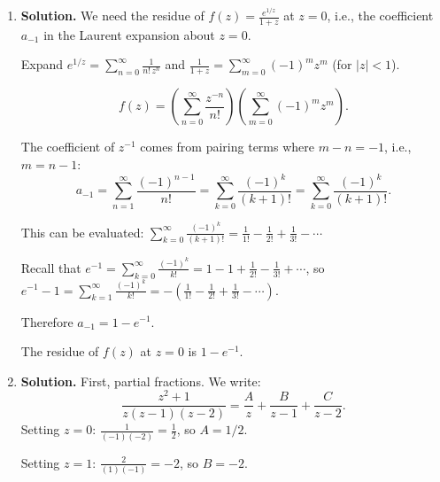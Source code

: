 \begin{enumerate}
For the region $0 < |z| < 2$, expand $\frac{1}{z-2} = \frac{-1}{2}\cdot\frac{1}{1 - z/2}$ as a geometric series (valid for $|z| < 2$):
\[
\frac{1}{z-2} = -\frac{1}{2}\sum_{n=0}^{\infty}\frac{z^n}{2^n} = -\sum_{n=0}^{\infty}\frac{z^n}{2^{n+1}}.
\]
Therefore:
\[
f(z) = -\frac{1}{2z} + \frac{1}{2}\left(-\sum_{n=0}^{\infty}\frac{z^n}{2^{n+1}}\right) = -\frac{1}{2z} - \sum_{n=0}^{\infty}\frac{z^n}{2^{n+2}}.
\]
\[
= -\frac{1}{2}\cdot z^{-1} - \frac{1}{4} - \frac{z}{8} - \frac{z^2}{16} - \cdots
\]

The Laurent series has a single term with negative power ($z^{-1}$ with coefficient $-1/2$), so $z = 0$ is a \textbf{simple pole} (pole of order $1$) with residue $-1/2$.

\item \textbf{Solution.}
We need the residue of $f(z) = \frac{e^{1/z}}{1+z}$ at $z = 0$, i.e., the coefficient $a_{-1}$ in the Laurent expansion about $z = 0$.

Expand $e^{1/z} = \sum_{n=0}^{\infty} \frac{1}{n!\, z^n}$ and $\frac{1}{1+z} = \sum_{m=0}^{\infty}(-1)^m z^m$ (for $|z| < 1$).

\[
f(z) = \left(\sum_{n=0}^{\infty}\frac{z^{-n}}{n!}\right)\left(\sum_{m=0}^{\infty}(-1)^m z^m\right).
\]

The coefficient of $z^{-1}$ comes from pairing terms where $m - n = -1$, i.e., $m = n - 1$:
\[
a_{-1} = \sum_{n=1}^{\infty} \frac{(-1)^{n-1}}{n!} = \sum_{k=0}^{\infty}\frac{(-1)^k}{(k+1)!} = \sum_{k=0}^{\infty}\frac{(-1)^k}{(k+1)!}.
\]

This can be evaluated: $\sum_{k=0}^{\infty}\frac{(-1)^k}{(k+1)!} = \frac{1}{1!} - \frac{1}{2!} + \frac{1}{3!} - \cdots$

Recall that $e^{-1} = \sum_{k=0}^{\infty}\frac{(-1)^k}{k!} = 1 - 1 + \frac{1}{2!} - \frac{1}{3!} + \cdots$, so $e^{-1} - 1 = \sum_{k=1}^{\infty}\frac{(-1)^k}{k!} = -\left(\frac{1}{1!} - \frac{1}{2!} + \frac{1}{3!} - \cdots\right)$.

Therefore $a_{-1} = 1 - e^{-1}$.

The residue of $f(z)$ at $z = 0$ is $\boxed{1 - e^{-1}}$.

\item \textbf{Solution.}
First, partial fractions. We write:
\[
\frac{z^2 + 1}{z(z-1)(z-2)} = \frac{A}{z} + \frac{B}{z-1} + \frac{C}{z-2}.
\]
Setting $z = 0$: $\frac{1}{(-1)(-2)} = \frac{1}{2}$, so $A = 1/2$.

Setting $z = 1$: $\frac{2}{(1)(-1)} = -2$, so $B = -2$.


\end{enumerate}
